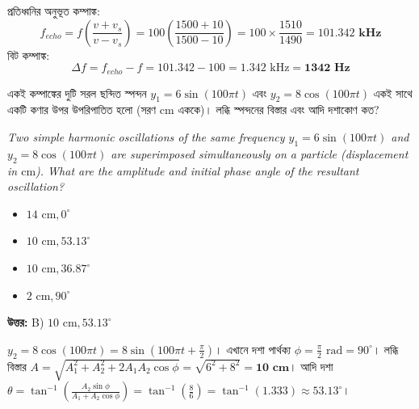 \documentclass[12pt, a4paper]{article}
\begin{document}
\begin{tcolorbox}[solutionbox={সমাধান (Solution)}]
    \noindent
    প্রতিধ্বনির অনুভূত কম্পাঙ্ক:
    \[ f_{echo} = f \left(\frac{v + v_s}{v - v_s}\right) = 100 \left(\frac{1500 + 10}{1500 - 10}\right) = 100 \times \frac{1510}{1490} = \mathbf{101.342\text{ kHz}} \]
    বিট কম্পাঙ্ক:
    \[ \Delta f = f_{echo} - f = 101.342 - 100 = 1.342\text{ kHz} = \mathbf{1342\text{ Hz}} \]
\end{tcolorbox}
\begin{tcolorbox}[questionbox={প্রশ্ন (Question) 11}]
    \noindent
    একই কম্পাঙ্কের দুটি সরল ছন্দিত স্পন্দন $y_1 = 6 \sin (100\pi t)$ এবং $y_2 = 8 \cos (100\pi t)$ একই সাথে একটি কণার উপর উপরিপাতিত হলো (সরণ $\text{cm}$ এককে)। লব্ধি স্পন্দনের বিস্তার এবং আদি দশাকোণ কত?
    
    \vspace{0.8em}
    \begin{english}
    \noindent\textit{\color{darkgray}
    Two simple harmonic oscillations of the same frequency $y_1 = 6 \sin (100\pi t)$ and $y_2 = 8 \cos (100\pi t)$ are superimposed simultaneously on a particle (displacement in $\text{cm}$). What are the amplitude and initial phase angle of the resultant oscillation?
    }
    \end{english}
\end{tcolorbox}

\begin{itemize}[label={}, leftmargin=1cm, itemsep=0.5em]
    \item[\textbf{A)}] $14\text{ cm}, 0^\circ$
    \item[\textbf{B)}] $10\text{ cm}, 53.13^\circ$
    \item[\textbf{C)}] $10\text{ cm}, 36.87^\circ$
    \item[\textbf{D)}] $2\text{ cm}, 90^\circ$
\end{itemize}

\vspace{0.5em}
\begin{tcolorbox}[answerbox]
    \textbf{\color{success} উত্তর:} B) $10\text{ cm}, 53.13^\circ$
\end{tcolorbox}
\vspace{1em}

\begin{tcolorbox}[solutionbox={সমাধান (Solution)}]
    \noindent
    $y_2 = 8 \cos(100\pi t) = 8 \sin(100\pi t + \frac{\pi}{2})$। এখানে দশা পার্থক্য $\phi = \frac{\pi}{2}\text{ rad} = 90^\circ$। লব্ধি বিস্তার $A = \sqrt{A_1^2 + A_2^2 + 2 A_1 A_2 \cos \phi} = \sqrt{6^2 + 8^2} = \mathbf{10\text{ cm}}$। আদি দশা $\theta = \tan^{-1} \left( \frac{A_2 \sin \phi}{A_1 + A_2 \cos \phi} \right) = \tan^{-1} \left( \frac{8}{6} \right) = \tan^{-1}(1.333) \approx \mathbf{53.13^\circ}$।
\end{tcolorbox}
\end{document}

